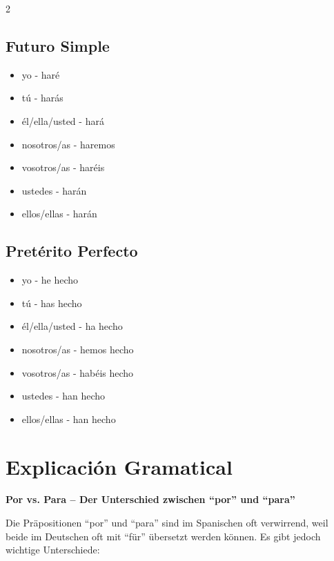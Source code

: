 \documentclass[12pt,a4paper]{article}
\begin{document}
\begin{multicols}{2}
\columnbreak

\subsection*{Futuro Simple}
\begin{itemize}[leftmargin=*]
    \item yo - haré
    \item tú - harás
    \item él/ella/usted - hará
    \item nosotros/as - haremos
    \item vosotros/as - haréis
    \item ustedes - harán
    \item ellos/ellas - harán
\end{itemize}

\subsection*{Pretérito Perfecto}
\begin{itemize}[leftmargin=*]
    \item yo - he hecho
    \item tú - has hecho
    \item él/ella/usted - ha hecho
    \item nosotros/as - hemos hecho
    \item vosotros/as - habéis hecho
    \item ustedes - han hecho
    \item ellos/ellas - han hecho
\end{itemize}

\end{multicols}

\newpage

\section*{Explicación Gramatical}

\textbf{Por vs. Para -- Der Unterschied zwischen \enquote{por} und \enquote{para}}

Die Präpositionen \enquote{por} und \enquote{para} sind im Spanischen oft verwirrend, weil beide im Deutschen oft mit \enquote{für} übersetzt werden können. Es gibt jedoch wichtige Unterschiede:
\end{document}

